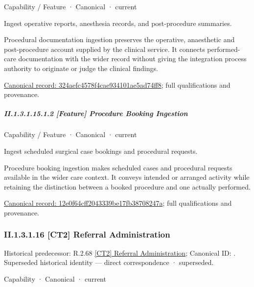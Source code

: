 \label{element:324aefc4578f4cae934101ae5ad74ff8}
{\small Capability / Feature · Canonical · current}\par

Ingest operative reports, anesthesia records, and post-procedure summaries.



Procedural documentation ingestion preserves the operative, anaesthetic and post-procedure account supplied by the clinical service. It connects performed-care documentation with the wider record without giving the integration process authority to originate or judge the clinical findings.


{\footnotesize \href{../../../../continuum/strategy/capability/feature/324aefc4578f4cae934101ae5ad74ff8.md}{Canonical record: 324aefc4578f4cae934101ae5ad74ff8}; full qualifications and provenance.}\par
\subparagraph*{II.1.3.1.15.1.2 [Feature] Procedure Booking Ingestion}
\label{navigation:II.1.3.1.15.1.2}

\label{element:12e0f64cff2043339be17fb38708247a}
{\small Capability / Feature · Canonical · current}\par

Ingest scheduled surgical case bookings and procedural requests.



Procedure booking ingestion makes scheduled cases and procedural requests available in the wider care context. It conveys intended or arranged activity while retaining the distinction between a booked procedure and one actually performed.


{\footnotesize \href{../../../../continuum/strategy/capability/feature/12e0f64cff2043339be17fb38708247a.md}{Canonical record: 12e0f64cff2043339be17fb38708247a}; full qualifications and provenance.}\par
\subsubsection*{II.1.3.1.16 [CT2] Referral Administration}
\label{navigation:II.1.3.1.16}

{\small Historical predecessor: R.2.68 \hyperref[element:5b0ccf4b30054145952c298b348ed266]{[CT2] Referral Administration}; Canonical ID: \texttt{}. Superseded historical identity — direct correspondence · superseded.}\par
\label{element:ae0de25600ee416aa24d2a167b64f230}
{\small Capability · Canonical · current}\par


